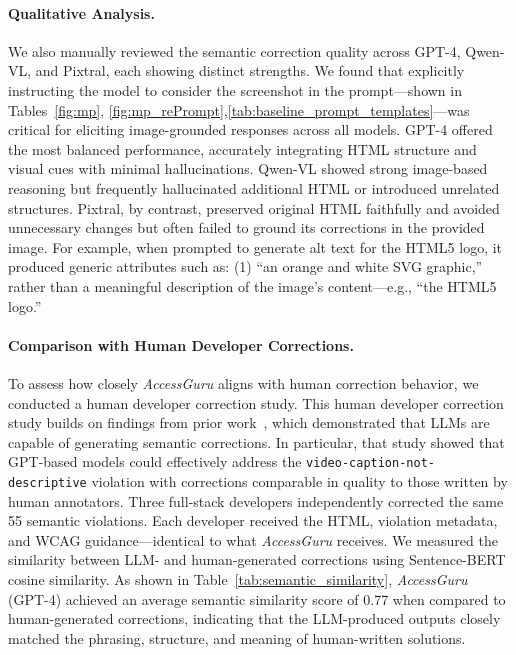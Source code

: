 \documentclass[sigconf, nonacm]{acmart}
\newcommand{\method}{\emph{AccessGuru}}
\begin{document}
\paragraph{Qualitative Analysis.}
We also manually reviewed the semantic correction quality across GPT-4, Qwen-VL, and Pixtral, each showing distinct strengths. We found that explicitly instructing the model to consider the screenshot in the prompt—shown in Tables~\ref{fig:mp}, \ref{fig:mp_rePrompt},\ref{tab:baseline_prompt_templates}—was critical for eliciting image-grounded responses across all models. GPT-4 offered the most balanced performance, accurately integrating HTML structure and visual cues with minimal hallucinations. Qwen-VL showed strong image-based reasoning but frequently hallucinated additional HTML or introduced unrelated structures. Pixtral, by contrast, preserved original HTML faithfully and avoided unnecessary changes but often failed to ground its corrections in the provided image. For example, when prompted to generate alt text for the HTML5 logo, it produced generic attributes such as: (1) “an orange and white SVG graphic,” rather than a meaningful description of the image’s content—e.g., “the HTML5 logo.”




\paragraph{Comparison with Human Developer Corrections.}
To assess how closely \method{} aligns with human correction behavior, we conducted a human developer correction study. This human developer correction study builds on findings from prior work~\cite{fathallah2024empowering}, which demonstrated that LLMs are capable of generating semantic corrections. In particular, that study showed that GPT-based models could effectively address the \texttt{video-caption-not-descriptive} violation with corrections comparable in quality to those written by human annotators. Three full-stack developers independently corrected the same 55 semantic violations. Each developer received the HTML, violation metadata, and WCAG guidance—identical to what \method{} receives. We measured the similarity between LLM- and human-generated corrections using Sentence-BERT cosine similarity. As shown in Table~\ref{tab:semantic_similarity}, \method{} (GPT-4) achieved an average semantic similarity score of 0.77 when compared to human-generated corrections, indicating that the LLM-produced outputs closely matched the phrasing, structure, and meaning of human-written solutions.
\end{document}
